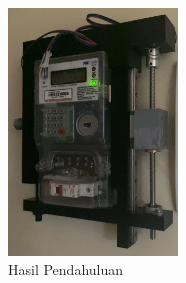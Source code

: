 \newpage
\begin{figure}[H]
  \centering
  \includegraphics[width=0.4\textwidth]{gambar/hasil-pendahuluan.jpg}
  \caption{Hasil Pendahuluan}
  \label{fig:hasil-pendahuluan}
\end{figure}